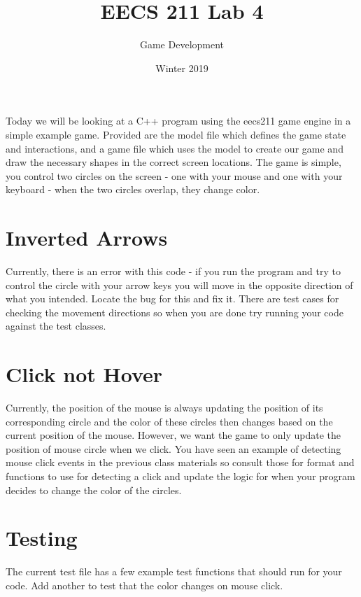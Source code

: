 \documentclass{tufte-handout}
\title{EECS 211 Lab 4}
\author{Game Development}
\date{Winter 2019}
\begin{document}
\maketitle

Today we will be looking at a C++ program using the eecs211 game engine in a simple example game. Provided are the model file which defines the game state and interactions, and a game file which uses the model to create our game and draw the necessary shapes in the correct screen locations. The game is simple, you control two circles on the screen - one with your mouse and one with your keyboard - when the two circles overlap, they change color.

\section{Inverted Arrows}

Currently, there is an error with this code - if you run the program and try to control the circle with your arrow keys you will move in the opposite direction of what you intended. Locate the bug for this and fix it. There are test cases for checking the movement directions so when you are done try running your code against the test classes.

\section{Click not Hover}

Currently, the position of the mouse is always updating the position of its corresponding circle and the color of these circles then changes based on the current position of the mouse. However, we want the game to only update the position of mouse circle when we click. You have seen an example of detecting mouse click events in the previous class materials so consult those for format and functions to use for detecting a click and update the logic for when your program decides to change the color of the circles.

\section{Testing}

The current test file has a few example test functions that should run for your code. Add another to test that the color changes on mouse click.
\end{document}
